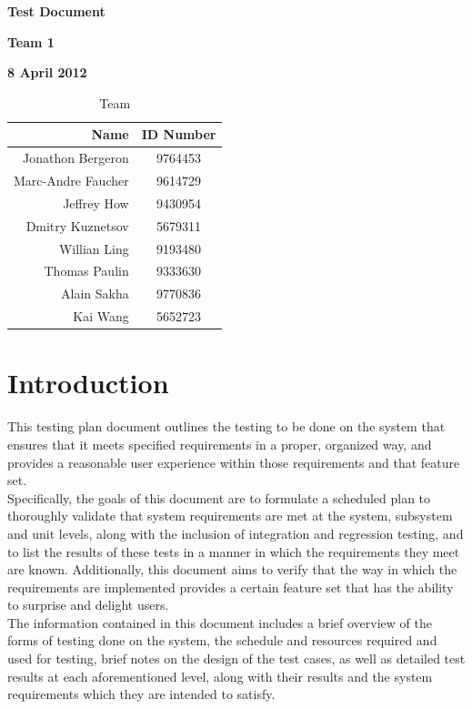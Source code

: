 \documentclass[12pt]{article}
\begin{document}
\vspace*{0.5in}
\centerline{\bf\Large Test Document}

\vspace*{0.5in}
\centerline{\bf\Large Team 1}

\vspace*{0.5in}
\centerline{\bf\Large 8 April 2012}

\vspace*{1.5in}
\begin{table}[htbp]
\caption{Team}
\begin{center}
\begin{tabular}{|r | c|}
\hline
Name & ID Number \\
\hline\hline
Jonathon Bergeron & 9764453 \\
Marc-Andre Faucher & 9614729 \\
Jeffrey How & 9430954 \\
Dmitry Kuznetsov & 5679311 \\
Willian Ling & 9193480 \\
Thomas Paulin & 9333630 \\
Alain Sakha & 9770836 \\
Kai Wang & 5652723 \\
\hline
\end{tabular}
\end{center}
\end{table}

\clearpage

\section{Introduction}

{
This testing plan document outlines the testing to be done on the system that ensures that it meets specified requirements in a proper, organized way, and provides a reasonable user experience within those requirements and that feature set. \\

Specifically, the goals of this document are to formulate a scheduled plan to thoroughly validate that system requirements are met at the system, subsystem and unit levels, along with the inclusion of integration and regression testing, and to list the results of these tests in a manner in which the requirements they meet are known. Additionally, this document aims to verify that the way in which the requirements are implemented provides a certain feature set that has the ability to surprise and delight users. \\

The information contained in this document includes a brief overview of the forms of testing done on the system, the schedule and resources required and used for testing, brief notes on the design of the test cases, as well as detailed test results at each aforementioned level, along with their results and the system requirements which they are intended to satisfy. \\
}
\end{document}
